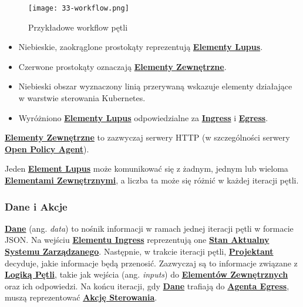 \begin{figure}[!h]
    \centering \texttt{[image: 33-workflow.png]}
    \caption{Przykładowe workflow pętli}\label{fig:33-workflow}
\end{figure}

\begin{itemize}
    \item Niebieskie, zaokrąglone prostokąty reprezentują \hyperlink{def:element-lupus}{\textbf{Elementy Lupus}}.
    \item Czerwone prostokąty oznaczają \hyperlink{def:element-zewnetrzny}{\textbf{Elementy Zewnętrzne}}.
    \item Niebieski obszar wyznaczony linią przerywaną wskazuje elementy działające w warstwie sterowania Kubernetes. 
    \item Wyróżniono \hyperlink{def:element-lupus}{\textbf{Elementy Lupus}} odpowiedzialne za \hyperlink{def:interfejs-lupin}{\textbf{Ingress}} i \hyperlink{def:interfejs-lupout}{\textbf{Egress}}.
\end{itemize}

\hyperlink{def:element-zewnetrzny}{\textbf{Elementy Zewnętrzne}} to zazwyczaj serwery HTTP (w szczególności serwery \hyperlink{def:opa}{\textbf{Open Policy Agent}}).

Jeden \hyperlink{def:element-lupus}{\textbf{Element Lupus}} może komunikować się z żadnym, jednym lub wieloma \hyperlink{def:element-zewnetrzny}{\textbf{Elementami Zewnętrznymi}}, a liczba ta może się różnić w każdej iteracji pętli.

\subsubsection{Dane i Akcje}

\hyperlink{def:dane}{\textbf{Dane}} (ang. \textit{data}) to nośnik informacji w ramach jednej iteracji pętli w formacie JSON. Na wejściu \hyperlink{def:element-ingres}{\textbf{Elementu Ingress}} reprezentują one \hyperlink{def:stan-aktualny}{\textbf{Stan Aktualny}} \hyperlink{def:system-zarzadzany}{\textbf{Systemu Zarządzanego}}. Następnie, w trakcie iteracji pętli, \hyperlink{def:projektant}{\textbf{Projektant}} decyduje, jakie informacje będą przenosić. Zazwyczaj są to informacje związane z \hyperlink{def:logika-petli}{\textbf{Logiką Pętli}}, takie jak wejścia (ang. \textit{inputs}) do \hyperlink{def:element-zewnetrzny}{\textbf{Elementów Zewnętrznych}} oraz ich odpowiedzi. Na końcu iteracji, gdy \hyperlink{def:dane}{\textbf{Dane}} trafiają do \hyperlink{def:agent-egress}{\textbf{Agenta Egress}}, muszą reprezentować \hyperlink{def:akcja-sterujaca}{\textbf{Akcję Sterowania}}. 

